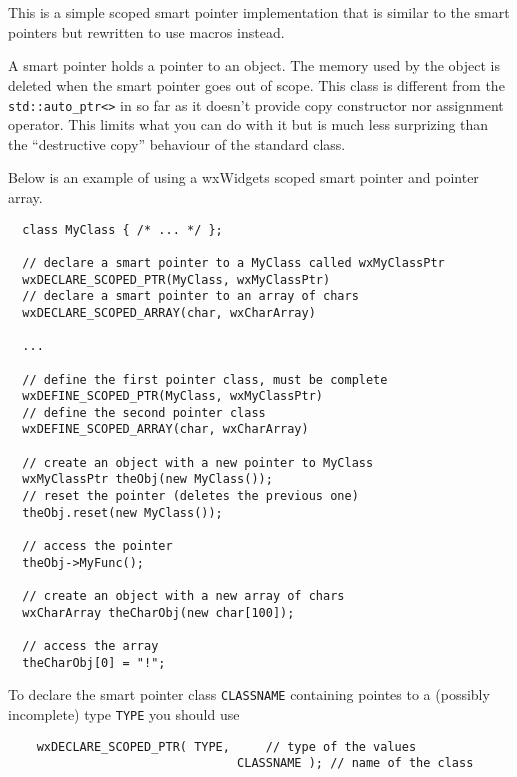 \section{}\label{wxscopedptr}

This is a simple scoped smart pointer implementation that is similar to 
the  smart pointers but rewritten to
use macros instead.

A smart pointer holds a pointer to an object. The memory used by the object is
deleted when the smart pointer goes out of scope. This class is different from
the \texttt{std::auto\_ptr<>} in so far as it doesn't provide copy constructor
nor assignment operator. This limits what you can do with it but is much less
surprizing than the ``destructive copy'' behaviour of the standard class.


Below is an example of using a wxWidgets scoped smart pointer and 
pointer array.

\begin{verbatim}
  class MyClass { /* ... */ };

  // declare a smart pointer to a MyClass called wxMyClassPtr
  wxDECLARE_SCOPED_PTR(MyClass, wxMyClassPtr)
  // declare a smart pointer to an array of chars
  wxDECLARE_SCOPED_ARRAY(char, wxCharArray)

  ...

  // define the first pointer class, must be complete
  wxDEFINE_SCOPED_PTR(MyClass, wxMyClassPtr)
  // define the second pointer class
  wxDEFINE_SCOPED_ARRAY(char, wxCharArray)

  // create an object with a new pointer to MyClass
  wxMyClassPtr theObj(new MyClass());
  // reset the pointer (deletes the previous one)
  theObj.reset(new MyClass());

  // access the pointer
  theObj->MyFunc();

  // create an object with a new array of chars
  wxCharArray theCharObj(new char[100]);

  // access the array
  theCharObj[0] = "!";
\end{verbatim}


To declare the smart pointer class \texttt{CLASSNAME} containing pointes to a
(possibly incomplete) type \texttt{TYPE} you should use

\begin{verbatim}
    wxDECLARE_SCOPED_PTR( TYPE,     // type of the values
                                CLASSNAME ); // name of the class
\end{verbatim}

